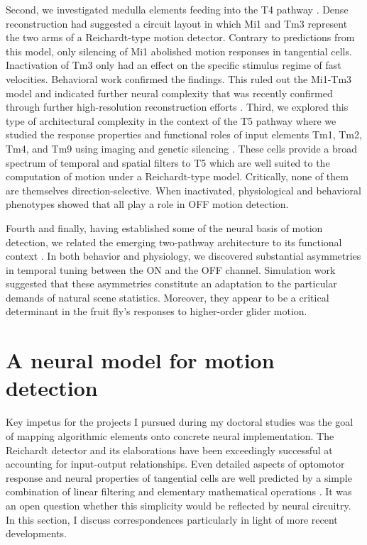 Second, we investigated medulla elements feeding into the T4 pathway \citep{Ammer:2015jo}. Dense reconstruction had suggested a circuit layout in which Mi1 and Tm3 represent the two arms of a Reichardt-type motion detector. Contrary to predictions from this model, only silencing of Mi1 abolished motion responses in tangential cells. Inactivation of Tm3 only had an effect on the specific stimulus regime of fast velocities. Behavioral work confirmed the findings. This ruled out the Mi1-Tm3 model and indicated further neural complexity that was recently confirmed through further high-resolution reconstruction efforts \citep{Takemura:2017aa}. Third, we explored this type of architectural complexity in the context of the T5 pathway where we studied the response properties and functional roles of input elements Tm1, Tm2, Tm4, and Tm9 using imaging and genetic silencing \citep{Serbe:2016ew}. These cells provide a broad spectrum of temporal and spatial filters to T5 which are well suited to the computation of motion under a Reichardt-type model. Critically, none of them are themselves direction-selective. When inactivated, physiological and behavioral phenotypes showed that all play a role in OFF motion detection. 

Fourth and finally, having established some of the neural basis of motion detection, we related the emerging two-pathway architecture to its functional context \citep{Leonhardt:2016ex}. In both behavior and physiology, we discovered substantial asymmetries in temporal tuning between the ON and the OFF channel. Simulation work suggested that these asymmetries constitute an adaptation to the particular demands of natural scene statistics. Moreover, they appear to be a critical determinant in the fruit fly's responses to higher-order glider motion.

\section{A neural model for motion detection}
Key impetus for the projects I pursued during my doctoral studies was the goal of mapping algorithmic elements onto concrete neural implementation. The Reichardt detector and its elaborations have been exceedingly successful at accounting for input-output relationships. Even detailed aspects of optomotor response and neural properties of tangential cells are well predicted by a simple combination of linear filtering and elementary mathematical operations \citep{Borst:1989vp,Borst:2002iw}. It was an open question whether this simplicity would be reflected by neural circuitry. In this section, I discuss correspondences particularly in light of more recent developments.

